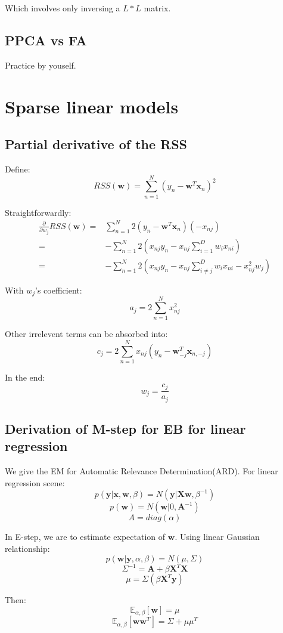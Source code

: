 \documentclass[UTF8]{ctexart}
\begin{document}
Which involves only inversing a $L*L$ matrix.

\subsection{PPCA vs FA}
Practice by youself.


\newpage
\section{Sparse linear models}
\subsection{Partial derivative of the RSS}
Define:
$$RSS(\textbf{w})=\sum_{n=1}^{N}(y_{n}-\textbf{w}^{T}\textbf{x}_{n})^{2}$$

Straightforwardly:
\begin{align}
\frac{\partial}{\partial w_{j}}RSS(\textbf{w})=&\sum_{n=1}^{N}2(y_{n}-\textbf{w}^{T}\textbf{x}_{n})(-x_{nj})\nonumber \\
=&-\sum_{n=1}^{N}2(x_{nj}y_{n}-x_{nj}\sum_{i=1}^{D}w_{i}x_{ni})\nonumber \\
=&-\sum_{n=1}^{N}2(x_{nj}y_{n}-x_{nj}\sum_{i\neq j}^{D}w_{i}x_{ni}-x_{nj}^{2}w_{j})\nonumber
\end{align}

With $w_{j}$'s coefficient:
$$a_{j}=2\sum_{n=1}^{N}x_{nj}^{2}$$

Other irrelevent terms can be absorbed into:
$$c_{j}=2\sum_{n=1}^{N}x_{nj}(y_{n}-\textbf{w}_{-j}^{T}\textbf{x}_{n,-j})$$

In the end:
$$w_{j}=\frac{c_{j}}{a_{j}}$$

\subsection{Derivation of M-step for EB for linear regression}
We give the EM for Automatic Relevance Determination(ARD). For linear regression scene:
$$p(\textbf{y}|\textbf{x},\textbf{w},\beta)=N(\textbf{y}|\textbf{X}\textbf{w},\beta^{-1})$$
$$p(\textbf{w})=N(\textbf{w}|0,\textbf{A}^{-1})$$
$$A=diag(\alpha)$$

In E-step, we are to estimate expectation of $\textbf{w}$. Using linear Gaussian relationship:
$$p(\textbf{w}|\textbf{y},\alpha,\beta)=N(\mu,\Sigma)$$
$$\Sigma^{-1}=\textbf{A}+\beta \textbf{X}^{T}\textbf{X}$$
$$\mu=\Sigma(\beta \textbf{X}^{T}\textbf{y})$$

Then:
$$\mathbb{E}_{\alpha,\beta}[\textbf{w}]=\mu$$
$$\mathbb{E}_{\alpha,\beta}[\textbf{w}\textbf{w}^{T}]=\Sigma+\mu\mu^{T}$$
\end{document}
